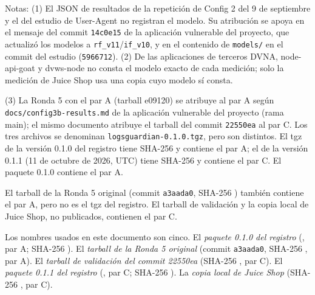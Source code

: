 \par\smallskip\footnotesize Notas: (1) El JSON de resultados de la repetición de Config 2 del 9 de septiembre y el del estudio de User-Agent no registran el modelo. Su atribución se apoya en el mensaje del commit \texttt{14c0e15} de la aplicación vulnerable del proyecto, que actualizó los modelos a \texttt{rf\_v11}/\texttt{if\_v10}, y en el contenido de \texttt{models/} en el commit del estudio (\texttt{5966712}). (2) De las aplicaciones de terceros DVNA\parencite{dvna}, node-api-goat\parencite{nodeapigoat} y dvws-node\parencite{dvwsnode} no consta el modelo exacto de cada medición; solo la medición de Juice Shop usa una copia cuyo modelo sí consta.

\footnotesize (3) La Ronda 5 con el par A (tarball e09120\textellipsis{}) se atribuye al par A según \texttt{docs/config3b-results.md} de la aplicación vulnerable del proyecto (rama main); el mismo documento atribuye el tarball del commit \texttt{22550ea} al par C. Los tres archivos se denominan \texttt{logsguardian-0.1.0.tgz}, pero son distintos. El tgz de la versión 0.1.0 del registro tiene SHA-256 \texttt{} y contiene el par A; el de la versión 0.1.1 (11 de octubre de 2026, UTC) tiene SHA-256 \texttt{} y contiene el par C. El paquete 0.1.0 contiene el par A. 

El tarball de la Ronda 5 original (commit \texttt{a3aada0}, SHA-256 \texttt{}) también contiene el par A, pero no es el tgz del registro. El tarball de validación y la copia local de Juice Shop, no publicados, contienen el par C.

\footnotesize Los nombres usados en este documento son cinco. El \textit{paquete 0.1.0 del registro} (, par A; SHA-256 \texttt{}). El \textit{tarball de la Ronda 5 original} (commit \texttt{a3aada0}, SHA-256 \texttt{}, par A). El \textit{tarball de validación del commit 22550ea} (SHA-256 \texttt{}, par C). El \textit{paquete 0.1.1 del registro} (, par C; SHA-256 \texttt{}). La \textit{copia local de Juice Shop} (SHA-256 \texttt{}, par C).

